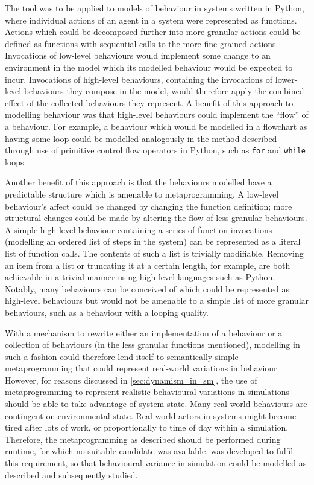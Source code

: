 The tool was to be applied to models of behaviour in \sociotechnical systems
written in Python, where individual actions of an agent in a system were
represented as functions. Actions which could be decomposed further into more
granular actions could be defined as functions with sequential calls to the more
fine-grained actions. Invocations of low-level behaviours would implement some
change to an environment in the model which its modelled behaviour would be
expected to incur. Invocations of high-level behaviours, containing the
invocations of lower-level behaviours they compose in the model, would therefore
apply the combined effect of the collected behaviours they represent. A benefit
of this approach to modelling behaviour was that high-level behaviours could
implement the ``flow'' of a behaviour. For example, a behaviour which would be
modelled in a flowchart as having some loop could be modelled analogously in the
method described through use of primitive control flow operators in Python, such
as \lstinline{for} and \lstinline{while} loops.

Another benefit of this approach is that the behaviours modelled have a
predictable structure which is amenable to metaprogramming. A low-level
behaviour's affect could be changed by changing the function definition; more
structural changes could be made by altering the flow of less granular
behaviours. A simple high-level behaviour containing a series of function
invocations (modelling an ordered list of steps in the \sociotechnical system)
can be represented as a literal list of function calls. The contents of such a
list is trivially modifiable. Removing an item from a list or truncating it at a
certain length, for example, are both achievable in a trivial manner using
high-level languages such as Python. Notably, many behaviours can be conceived
of which could be represented as high-level behaviours but would not be amenable
to a simple list of more granular behaviours, such as a behaviour with a looping
quality. 

With a mechanism to rewrite either an implementation of a behaviour or a
collection of behaviours (in the less granular functions mentioned), modelling
in such a fashion could therefore lend itself to semantically simple
metaprogramming that could represent real-world variations in behaviour.
However, for reasons discussed in \cref{sec:dynamism_in_sm},
the use of metaprogramming to represent realistic behavioural variations in
\sociotechnical simulations should be able to take advantage of system state.
Many real-world behaviours are contingent on environmental state. Real-world
actors in \sociotechnical systems might become tired after lots of work, or
proportionally to time of day within a simulation. Therefore, the
metaprogramming as described should be performed during runtime, for which no
suitable candidate was available. \pydysofu{} was developed to fulfil this
requirement, so that behavioural variance in \sociotechnical simulation could be
modelled as described and subsequently studied.



